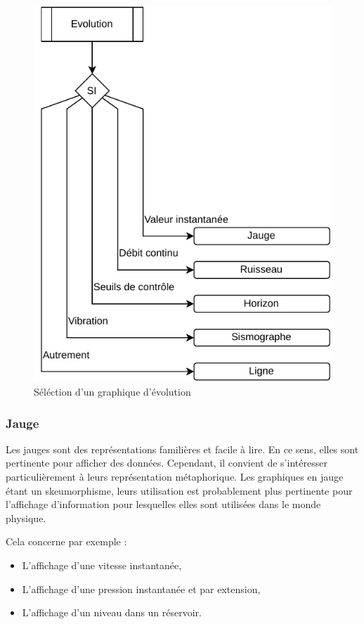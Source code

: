 \documentclass[a4paper,12pt]{article}
\begin{document}
\begin{multicols}{2}
\begin{figure}[H]
\centering
\includegraphics[width=.9\linewidth]{./img/select-evolution.pdf}
\caption{\label{fig:org95d02ad}Séléction d'un graphique d'évolution}
\end{figure}
\subsubsection*{Jauge}
\label{sec:org54817f7}
Les jauges sont des représentations familières et facile à lire. \autocite{jonathanschwabishComparingCategories2021} En ce sens, elles sont pertinente pour afficher des données. Cependant, il convient de s'intéresser particulièrement à leurs représentation métaphorique. Les graphiques en jauge étant un skeumorphisme, leurs utilisation est probablement plus pertinente pour l'affichage d'information pour lesquelles elles sont utilisées dans le monde physique.

Cela concerne par exemple :
\begin{itemize}
\item L'affichage d'une vitesse instantanée,
\item L'affichage d'une pression instantanée et par extension,
\item L'affichage d'un niveau dans un réservoir.
\end{itemize}


\end{multicols}
\end{document}
